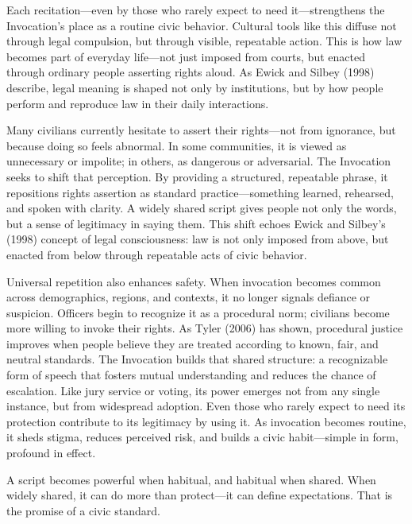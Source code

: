 Each recitation—even by those who rarely expect to need it—strengthens the Invocation’s place as a routine civic behavior. Cultural tools like this diffuse not through legal compulsion, but through visible, repeatable action. This is how law becomes part of everyday life—not just imposed from courts, but enacted through ordinary people asserting rights aloud. As Ewick and Silbey (1998) describe, legal meaning is shaped not only by institutions, but by how people perform and reproduce law in their daily interactions.

Many civilians currently hesitate to assert their rights—not from ignorance, but because doing so feels abnormal. In some communities, it is viewed as unnecessary or impolite; in others, as dangerous or adversarial. The Invocation seeks to shift that perception. By providing a structured, repeatable phrase, it repositions rights assertion as standard practice—something learned, rehearsed, and spoken with clarity. A widely shared script gives people not only the words, but a sense of legitimacy in saying them. This shift echoes Ewick and Silbey’s (1998) concept of legal consciousness: law is not only imposed from above, but enacted from below through repeatable acts of civic behavior.

Universal repetition also enhances safety. When invocation becomes common across demographics, regions, and contexts, it no longer signals defiance or suspicion. Officers begin to recognize it as a procedural norm; civilians become more willing to invoke their rights. As Tyler (2006) has shown, procedural justice improves when people believe they are treated according to known, fair, and neutral standards. The Invocation builds that shared structure: a recognizable form of speech that fosters mutual understanding and reduces the chance of escalation. Like jury service or voting, its power emerges not from any single instance, but from widespread adoption. Even those who rarely expect to need its protection contribute to its legitimacy by using it. As invocation becomes routine, it sheds stigma, reduces perceived risk, and builds a civic habit—simple in form, profound in effect.

A script becomes powerful when habitual, and habitual when shared. When widely shared, it can do more than protect—it can define expectations. That is the promise of a civic standard.
